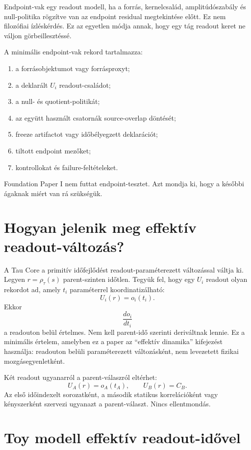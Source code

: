 \documentclass[12pt]{article}
\newcommand{\Rmap}{\rho_{\tau}}
\begin{document}
Endpoint-vak egy readout modell, ha a forrás, kernelcsalád, amplitúdószabály
és null-politika rögzítve van az endpoint residual megtekintése előtt.  Ez nem
filozófiai ízléskérdés.  Ez az egyetlen módja annak, hogy egy tág readout
keret ne váljon görbeillesztéssé.

A minimális endpoint-vak rekord tartalmazza:
\begin{enumerate}[label=(E\arabic*)]
  \item a forrásobjektumot vagy forrásproxyt;
  \item a deklarált \(U_i\) readout-családot;
  \item a null- és quotient-politikát;
  \item az együtt használt csatornák source-overlap döntését;
  \item freeze artifactot vagy időbélyegzett deklarációt;
  \item tiltott endpoint mezőket;
  \item kontrollokat és failure-feltételeket.
\end{enumerate}

Foundation Paper I nem futtat endpoint-tesztet.  Azt mondja ki, hogy a későbbi
ágaknak miért van rá szükségük.

\section{Hogyan jelenik meg effektív readout-változás?}

A Tau Core a primitív időfejlődést readout-paraméterezett változással váltja
ki.  Legyen \(r=\Rmap(s)\) parent-szinten időtlen.  Tegyük fel, hogy egy
\(U_i\) readout olyan rekordot ad, amely \(t_i\) paraméterrel koordinatizálható:
\[
  U_i(r)=o_i(t_i).
\]
Ekkor
\[
  \frac{do_i}{dt_i}
\]
a readouton belül értelmes.  Nem kell parent-idő szerinti deriváltnak lennie.
Ez a minimális értelem, amelyben ez a paper az ``effektív dinamika'' kifejezést
használja: readouton belüli paraméterezett változásként, nem levezetett fizikai
mozgásegyenletként.

Két readout ugyanarról a parent-válaszról eltérhet:
\[
  U_A(r)=o_A(t_A),\qquad U_B(r)=C_B.
\]
Az első időindexelt sorozatként, a második statikus korrelációként vagy
kényszerként szervezi ugyanazt a parent-választ.  Nincs ellentmondás.

\section{Toy modell effektív readout-idővel}
\end{document}
